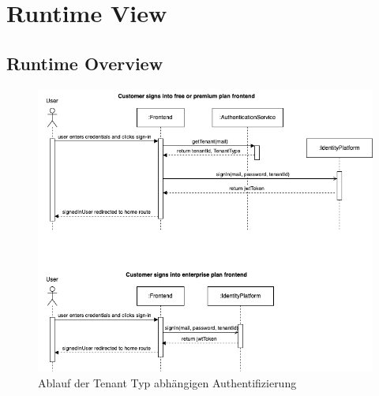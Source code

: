 \section{Runtime View}
\subsection{Runtime Overview}

\begin{figure}[ht]
  \centering
  \includegraphics[width=\textwidth]{resources/03-runtime-view/03-authentication-sequence.drawio.png}
  \caption{Ablauf der Tenant Typ abhängigen Authentifizierung}
  \label{fig:authentication-sequence}
\end{figure}






